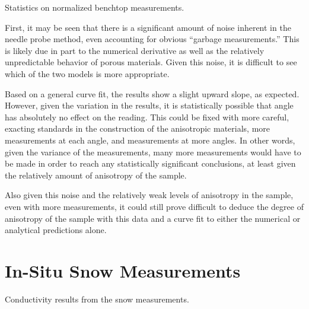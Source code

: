 \begin{table}[h]
\centering

\label{tab:pow-stats}
\caption{Statistics on normalized benchtop measurements.}
\end{table}


First, it may be seen that there is a significant amount of noise inherent in
the needle probe method, even accounting for obvious ``garbage measurements.''
This is likely due in part to the numerical derivative as well as the relatively
unpredictable behavior of porous materials. Given
this noise, it is difficult to see which of the two models is more appropriate.

Based on a general curve fit, the results show a slight upward slope, as
expected. However, given the variation in the results, it is statistically
possible that angle has absolutely no effect on the reading. This could be fixed
with more careful, exacting standards in the construction of the anisotropic
materials, more measurements at each angle, and measurements at more angles.
In other words, given the variance of the measurements, many more measurements
would have to be made in order to reach any statistically significant
conclusions, at least given the relatively amount of anisotropy of the sample.

Also given this noise and the relatively weak levels of anisotropy in the
sample, even with more measurements, it could still prove difficult to deduce
the degree of anisotropy of the sample with this data and a curve fit to either
the numerical or analytical predictions alone.

\section{In-Situ Snow Measurements}

\begin{table}[h]
\centering

\label{tab:snow}
\caption{Conductivity results from the snow measurements.}
\end{table}

